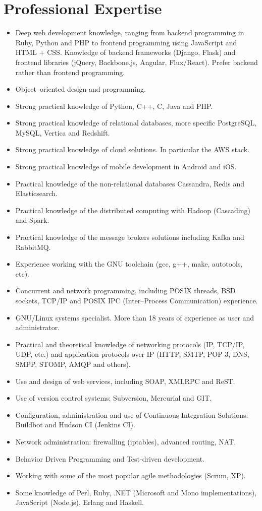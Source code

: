 \documentclass[a4paper,11pt]{moderncv}
\begin{document}
\section{Professional Expertise}
\begin{itemize}
\item Deep web development knowledge, ranging from backend programming in
  Ruby, Python and PHP to frontend programming using JavaScript and HTML + CSS.
  Knowledge of backend frameworks (Django, Flask) and frontend libraries
  (jQuery, Backbone.js, Angular, Flux/React). Prefer backend rather than
  frontend programming.
\item Object--oriented design and programming.
\item Strong practical knowledge of Python, C++, C, Java and PHP.
\item Strong practical knowledge of relational databases, more specific
  PostgreSQL, MySQL, Vertica and Redshift.
\item Strong practical knowledge of cloud solutions. In particular the AWS stack.
\item Strong practical knowledge of mobile development in Android and iOS.
\item Practical knowledge of the non-relational databases Cassandra, Redis and
  Elasticsearch.
\item Practical knowledge of the distributed computing with Hadoop (Cascading)
  and Spark.
\item Practical knowledge of the message brokers solutions including Kafka
  and RabbitMQ.
\item Experience working with the GNU toolchain (gcc, g++, make, autotools,
  etc).
\item Concurrent and network programming, including POSIX threads, BSD sockets,
  TCP/IP and POSIX IPC (Inter--Process Communication) experience.
\item GNU/Linux systems specialist. More than 18 years of experience as user
  and administrator.
\item Practical and theoretical knowledge of networking protocols (IP, TCP/IP,
  UDP, etc.) and application protocols over IP (HTTP, SMTP, POP 3, DNS, SMPP,
  STOMP, AMQP and others).
\item Use and design of web services, including SOAP, XMLRPC and ReST.
\item Use of version control systems: Subversion, Mercurial and GIT.
\item Configuration, administration and use of Continuous Integration
Solutions: Buildbot and Hudson CI (Jenkins CI).
\item Network administration: firewalling (iptables), advanced routing, NAT.
\item Behavior Driven Programming and Test-driven development.
\item Working with some of the most popular agile methodologies (Scrum, XP).
\item Some knowledge of Perl, Ruby, .NET (Microsoft and Mono implementations),
  JavaScript (Node.js), Erlang and Haskell.
\end{itemize}
\end{document}
